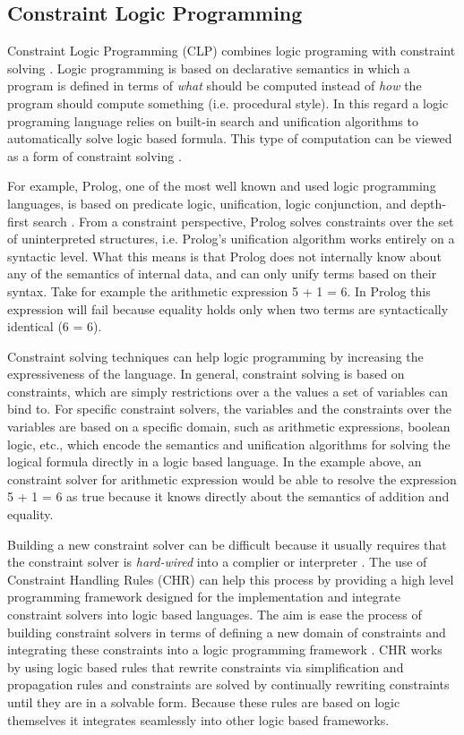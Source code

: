 \documentclass[12pt]{ucthesis}
\begin{document}
\subsection{Constraint Logic Programming}
Constraint Logic Programming (CLP) combines logic programing with constraint solving \cite{GavanelliCLP} \cite{WallaceCLP}. Logic programming is based on declarative semantics in which a program is defined in terms of \emph{what} should be computed instead of \emph{how} the program should compute something (i.e. procedural style). In this regard a logic programing language relies on built-in search and unification algorithms to automatically solve logic based formula. This type of computation can be viewed as a form of constraint solving \cite{GavanelliCLP}. 

For example, Prolog, one of the most well known and used logic programming languages, is based on predicate logic, unification, logic conjunction, and depth-first search \cite{Sterling:1986}. From a constraint perspective, Prolog solves constraints over the set of uninterpreted structures, i.e. Prolog's unification algorithm works entirely on a syntactic level. What this means is that Prolog does not internally know about any of the semantics of internal data, and can only unify terms based on their syntax. Take for example the arithmetic expression 5 + 1 = 6. In Prolog this expression will fail because equality holds only when two terms are syntactically identical (6 = 6).  

Constraint solving techniques can help logic programming by increasing the expressiveness of the language. In general, constraint solving is based on constraints, which are simply restrictions over a the values a set of variables can bind to. For specific constraint solvers, the variables and the constraints over the variables are based on a specific domain, such as arithmetic expressions, boolean logic, etc., which encode the semantics and unification algorithms for solving the logical formula directly in a logic based language. In the example above, an constraint solver for arithmetic expression would be able to resolve the expression 5 + 1 = 6 as true because it knows directly about the semantics of addition and equality. 

Building a new constraint solver can be difficult because it usually requires that the constraint solver is \emph{hard-wired} into a complier or interpreter \cite{GavanelliCLP}. The use of Constraint Handling Rules (CHR) can help this process by providing a high level programming framework designed for the implementation and integrate constraint solvers into logic based languages. The aim is ease the process of building constraint solvers in terms of defining a new domain of constraints and integrating these constraints into a logic programming framework \cite{CHR}. CHR works by using logic based rules that rewrite constraints via simplification and propagation rules and constraints are solved by continually rewriting constraints until they are in a solvable form. Because these rules are based on logic themselves it integrates seamlessly into other logic based frameworks. 
\end{document}
